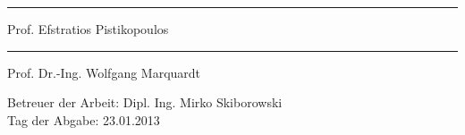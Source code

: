  \vfill{
\begin{flushright}
	\begin{minipage}[r]{10cm}
		\begin{center}
			\hrule\vspace*{2ex}Prof. Efstratios Pistikopoulos\\
			\vspace{1.5cm}
			\hrule\vspace*{2ex}Prof. Dr.-Ing. Wolfgang Marquardt\\
			\vspace{0.5cm}
		\end{center}
	\end{minipage}
\end{flushright}


Betreuer der Arbeit: Dipl. Ing. Mirko Skiborowski\\
Tag der Abgabe: 23.01.2013
}
\clearpage
